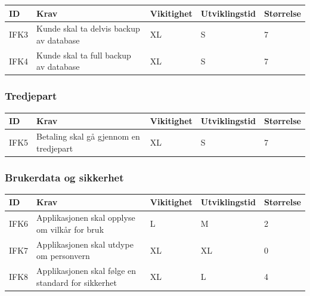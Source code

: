 \documentclass[12pt]{article}
\newcommand{\celly}{\cellcolor{yellow!25}}
\newcommand{\celll}{\cellcolor{lime!25}}
\newcommand{\cellg}{\cellcolor{green!25}}
\begin{document}
        \begin{tabular}{|p{2cm}|p{6cm}|
            >{\centering\arraybackslash}p{2cm}|
            >{\centering\arraybackslash}p{2cm}|
            >{\centering\arraybackslash}p{2cm}|}
            \hline
            \bf ID & \bf Krav & \bf Vikitighet & \bf Utviklingstid & \bf Størrelse\\
            \hline
            IFK3
            &
            Kunde skal ta delvis backup av database
            & XL & S & \cellg 7\\
            \hline
            IFK4
            &
            Kunde skal ta full backup av database
            & XL & S & \cellg 7\\
            \hline
        \end{tabular}

        \subsubsection{Tredjepart}

        \begin{tabular}{|p{2cm}|p{6cm}|
            >{\centering\arraybackslash}p{2cm}|
            >{\centering\arraybackslash}p{2cm}|
            >{\centering\arraybackslash}p{2cm}|}
            \hline
            \bf ID & \bf Krav & \bf Vikitighet & \bf Utviklingstid & \bf Størrelse\\
            \hline
            IFK5
            &
            Betaling skal gå gjennom en tredjepart
            & XL & S & \cellg 7\\
            \hline
        \end{tabular}

        \subsubsection{Brukerdata og sikkerhet}

        \begin{tabular}{|p{2cm}|p{6cm}|
            >{\centering\arraybackslash}p{2cm}|
            >{\centering\arraybackslash}p{2cm}|
            >{\centering\arraybackslash}p{2cm}|}
            \hline
            \bf ID & \bf Krav & \bf Vikitighet & \bf Utviklingstid & \bf Størrelse\\
            \hline
            IFK6
            &
            Applikasjonen skal opplyse om vilkår for bruk
            & L & M & \celll 2\\
            \hline
            IFK7
            &
            Applikasjonen skal utdype om personvern
            & XL & XL & \celly 0\\
            \hline
            IFK8
            &
            Applikasjonen skal følge en standard for sikkerhet
            & XL & L & \cellg 4\\
            \hline
        \end{tabular}
\end{document}
